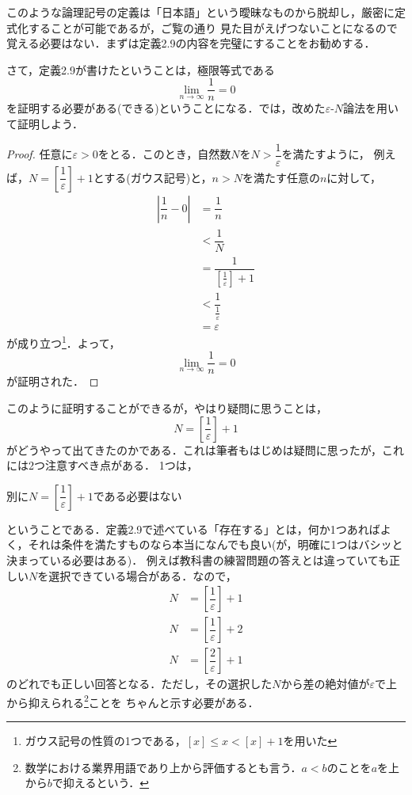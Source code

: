 \documentclass[a4paper,12pt,autodetect-engine,dvipdfmx]{jsarticle}
\theoremstyle{definition}
\begin{document}
このような論理記号の定義は「日本語」という曖昧なものから脱却し，厳密に定式化することが可能であるが，ご覧の通り
見た目がえげつないことになるので覚える必要はない．まずは定義2.9の内容を完璧にすることをお勧めする．

さて，定義2.9が書けたということは，極限等式である
$$\lim_{n \to \infty}\dfrac{1}{n} = 0$$
を証明する必要がある(できる)ということになる．では，改めた$\varepsilon$-$N$論法を用いて証明しよう．
\begin{proof}
    任意に$\varepsilon>0$をとる．このとき，自然数$N$を$N>\dfrac{1}{\varepsilon}$を満たすように，
    例えば，$N=\left[\dfrac{1}{\varepsilon}\right]+1$とする(ガウス記号)と，$n>N$を満たす任意の$n$に対して，
    \begin{align*}
        \left|\dfrac{1}{n} - 0 \right| &= \dfrac{1}{n}\\
                                       &< \dfrac{1}{N}\\
                                       &= \dfrac{1}{[\frac{1}{\varepsilon}]+1}\\
                                       &< \dfrac{1}{\frac{1}{\varepsilon}}\\
                                       &= \varepsilon
    \end{align*}
    が成り立つ\footnote{ガウス記号の性質の1つである，$[x] \leq x < [x] + 1$を用いた}．よって，
    $$\lim_{n \to \infty}\dfrac{1}{n} = 0$$
    が証明された．
\end{proof}
このように証明することができるが，やはり疑問に思うことは，
$$N = \left[\dfrac{1}{\varepsilon}\right]+1$$
がどうやって出てきたのかである．これは筆者もはじめは疑問に思ったが，これには2つ注意すべき点がある．
1つは，
\begin{center}
    別に$N = \left[\dfrac{1}{\varepsilon}\right]+1$である必要はない
\end{center}
ということである．定義2.9で述べている「存在する」とは，何か1つあればよく，それは条件を満たすものなら本当になんでも良い(が，明確に1つはバシッと決まっている必要はある)．
例えば教科書の練習問題の答えとは違っていても正しい$N$を選択できている場合がある．なので，
\begin{align*}
    N &= \left[\dfrac{1}{\varepsilon}\right]+1\\
    N &= \left[\dfrac{1}{\varepsilon}\right]+2\\
    N &= \left[\dfrac{2}{\varepsilon}\right]+1
\end{align*}
のどれでも正しい回答となる．ただし，その選択した$N$から差の絶対値が$\varepsilon$で上から抑えられる\footnote{数学における業界用語であり上から評価するとも言う．$a<b$のことを$a$を上から$b$で抑えるという．}ことを
ちゃんと示す必要がある．
\end{document}

